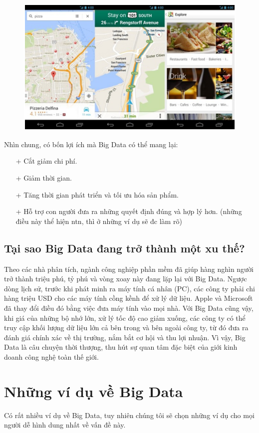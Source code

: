 \documentclass[12pt]{report}
\begin{document}
\begin{figure}[H]
\centering
\includegraphics[scale=1]{util.png}
\end{figure}
Nhìn chung, có bốn lợi ích mà Big Data có thể mang lại: 
\begin{itemize}
	\item[+] Cắt giảm chi phí.
	\item[+] Giảm thời gian.
	\item[+] Tăng thời gian phát triển và tối ưu hóa sản phẩm.
	\item[+] Hỗ trợ con người đưa ra những quyết định đúng và hợp lý hơn. (những điều này thể hiện ntn, thì ở những ví dụ sẽ đc làm rõ)
\end{itemize}

\subsection{Tại sao Big Data đang trở thành một xu thế?}
Theo các nhà phân tích, ngành công nghiệp phần mềm đã giúp hàng nghìn người trở thành triệu phú, tỷ phú và vòng xoay này đang lặp lại với Big Data. Ngược dòng lịch sử, trước khi phát minh ra máy tính cá nhân (PC), các công ty phải chi hàng triệu USD cho các máy tính cồng kềnh để xử lý dữ liệu. Apple và Microsoft đã thay đổi điều đó bằng việc đưa máy tính vào mọi nhà. Với Big Data cũng vậy, khi giá của những bộ nhớ lớn, xử lý tốc độ cao giảm xuống, các công ty có thể truy cập khối lượng dữ liệu lớn cả bên trong và bên ngoài công ty, từ đó đưa ra đánh giá chính xác về thị trường, nắm bắt cơ hội và thu lợi nhuận.  Vì vậy, Big Data là câu chuyện thời thượng, thu hút sự quan tâm đặc biệt của giới kinh doanh công nghệ toàn thế giới.

\section{Những ví dụ về Big Data}
Có rất nhiều ví dụ về Big Data, tuy nhiên chúng tôi sẽ chọn những ví dụ cho mọi người dễ hình dung nhất về vấn đề này.
\end{document}
